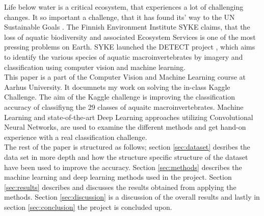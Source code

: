 Life below water is a critical ecosystem, that experiences a lot of challenging changes. It so important a challenge, that it has found its' way to the UN Sustainable Goals \cite{UN}. The Finnish Environment Institute \cite{meissner} SYKE claims, that the loss of aquatic biodiversity and associated Ecosystem Services is one of the most pressing problems on Earth. SYKE launched the DETECT project \cite{DETECT}, which aims to identify the various species of aquatic macroinvertebrates by imagery and classification using computer vision and machine learning. \\

This paper is a part of the Computer Vision and Machine Learning course at Aarhus University. It documnets my work on solving the in-class Kaggle Challenge. The aim of the Kaggle challenge is improving the classification accuracy of classifiyng the 29 classes of aquaitc macroinvertebrates. Machine Learning and state-of-the-art Deep Learning approaches utilizing Convolutional Neural Networks, are used to examine the different methods and get hand-on experience with a real classification challenge. \\

The rest of the paper is structured as follows; section \ref{sec:dataset} desribes the data set in more depth and how the structure specific structure of the dataset have been used to improve the accuracy. Section \ref{sec:methods} describes the machine learning and deep learning methods used in the project. Section \ref{sec:results} describes and discusses the results obtained from applying the methods. Section \ref{sec:discussion} is a discussion of the overall results and lastly in section \ref{sec:conclusion} the project is concluded upon.